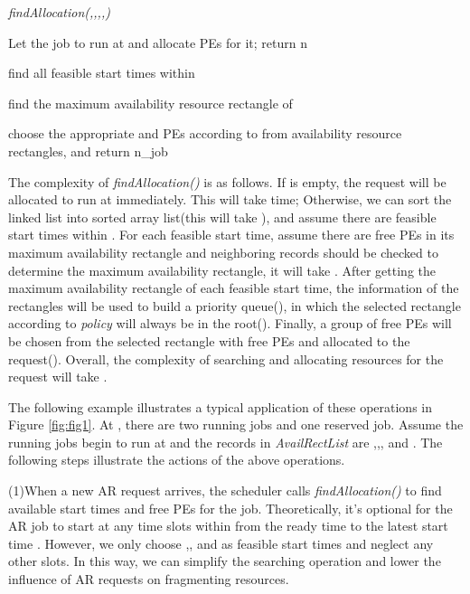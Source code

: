 \documentclass[preprint,12pt]{elsarticle}
\begin{document}
\begin{algorithm}[htbp]
\caption{\em{findAllocation}(,,,,)}
\label{alg:findResources}

    {
    Let the job to run at  and allocate  PEs for it;\;\label{alg3:line:p1}
    return n\;\label{alg3:line:p2}
    }{
    find all feasible start times  within \;\label{alg3:line:p3}

        {\label{alg3:line:p31}

        find the maximum availability resource rectangle  of \;\label{alg3:line:p40}

        \;}

    \label{alg3:line:p4}



    {
    choose the appropriate  and  PEs according to  from availability resource rectangles, and return n_{job}\;\label{alg3:line:p5}
    }
    \label{alg3:line:p6}
    }

\end{algorithm}


The complexity of \emph{findAllocation()} is as follows. If  is empty, the request will be allocated to run at  immediately. This will take  time; Otherwise, we can sort the linked list into sorted array list(this will take ), and assume there are  feasible start times within . For each feasible start time, assume there are  free PEs in its maximum availability rectangle and  neighboring records should be checked to determine the maximum availability rectangle, it will take . After getting the maximum availability rectangle of each feasible start time, the information of the rectangles will be used to build a priority queue(), in which the selected rectangle according to \emph{policy} will always be in the root(). Finally, a group of  free PEs will be chosen from the selected rectangle
with  free PEs and allocated to the request(). Overall, the complexity of searching and allocating resources for the request will take  .

The following example illustrates a typical application of these operations in Figure \ref{fig:fig1}. At , there are two running jobs and one reserved job. Assume the running jobs begin to run at  and the records in \emph{AvailRectList} are ,,, and . The following steps illustrate the actions of the above operations.

(1)When a new AR request  arrives, the scheduler calls \emph{findAllocation()} to find available start times and free PEs for the job. Theoretically, it's optional for the AR job to start at any time slots within from the ready time  to the latest start time . However, we only choose ,, and  as feasible start times and neglect any other slots. In this way, we can simplify the searching operation and lower the influence of AR requests on fragmenting resources.
\end{document}
